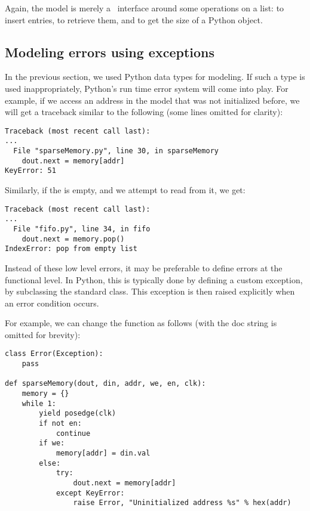 Again, the model is merely a \myhdl\ interface around some operations
on a list:  to insert entries,  to
retrieve them, and  to get the size of a Python
object.

\subsection{Modeling errors using exceptions \label{model-err}}

In the previous section, we used Python data types for modeling. If
such a type is used inappropriately, Python's run time error system
will come into play. For example, if we access an address in the
 model that was not initialized before, we will
get a traceback similar to the following (some lines omitted for
clarity):

\begin{verbatim}
Traceback (most recent call last):
...
  File "sparseMemory.py", line 30, in sparseMemory
    dout.next = memory[addr]
KeyError: 51
\end{verbatim}

Similarly, if the  is empty, and we attempt to read from
it, we get:

\begin{verbatim}
Traceback (most recent call last):
...
  File "fifo.py", line 34, in fifo
    dout.next = memory.pop()
IndexError: pop from empty list
\end{verbatim}

Instead of these low level errors, it may be preferable to define
errors at the functional level. In Python, this is typically done by
defining a custom  exception, by subclassing the standard
 class. This exception is then raised explicitly when
an error condition occurs.

For example, we can change the  function as
follows (with the doc string is omitted for brevity):

\begin{verbatim}
class Error(Exception):
    pass

def sparseMemory(dout, din, addr, we, en, clk):
    memory = {}
    while 1:
        yield posedge(clk)
        if not en:
            continue
        if we:
            memory[addr] = din.val
        else:
            try:
                dout.next = memory[addr]
            except KeyError:
                raise Error, "Uninitialized address %s" % hex(addr)
\end{verbatim}

